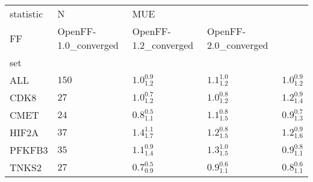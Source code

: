 \begin{tabular}{lllll}
\toprule
statistic &      N & \multicolumn{3}{l}{MUE} \\
FF & OpenFF-1.0_converged & OpenFF-1.2_converged & OpenFF-2.0_converged \\
set    &        &                      &                      &                      \\
\midrule
ALL    &  $150$ &    $1.0^{0.9}_{1.2}$ &    $1.1^{1.0}_{1.2}$ &    $1.0^{0.9}_{1.2}$ \\
CDK8   &   $27$ &    $1.0^{0.7}_{1.2}$ &    $1.0^{0.8}_{1.2}$ &    $1.2^{0.9}_{1.4}$ \\
CMET   &   $24$ &    $0.8^{0.5}_{1.1}$ &    $1.1^{0.8}_{1.5}$ &    $0.9^{0.7}_{1.3}$ \\
HIF2A  &   $37$ &    $1.4^{1.1}_{1.7}$ &    $1.2^{0.8}_{1.5}$ &    $1.2^{0.9}_{1.6}$ \\
PFKFB3 &   $35$ &    $1.1^{0.9}_{1.4}$ &    $1.3^{1.0}_{1.5}$ &    $0.9^{0.8}_{1.1}$ \\
TNKS2  &   $27$ &    $0.7^{0.5}_{0.9}$ &    $0.9^{0.6}_{1.1}$ &    $0.8^{0.6}_{1.1}$ \\
\bottomrule
\end{tabular}
